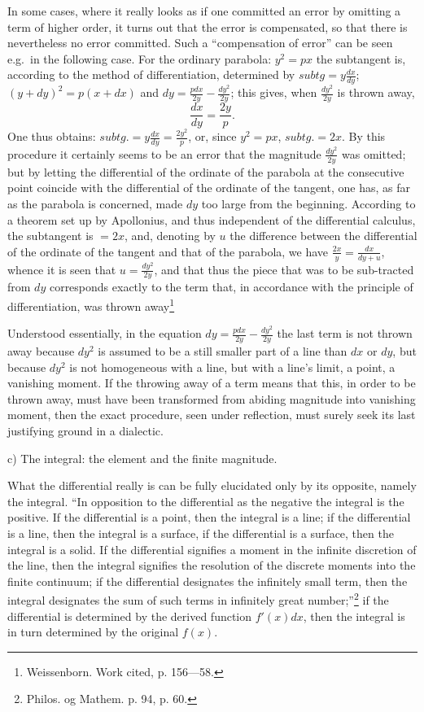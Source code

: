 \documentclass[12pt,a4paper,openany]{book}
\newcommand{\opage}[1]{\marginnote{\footnotesize\textit{[#1]}}}
\begin{document}
In some cases, where it really looks as if
one committed an error by omitting a term of higher order,
it turns out that the error is compensated, so that there is nevertheless %
no error committed. Such a ``compensation of error''
can be seen e.g.\ in the following case. For the ordinary
parabola: $y^{2}=px$ the subtangent is, according to the method of differentiation,
determined by $subtg=y\frac{dx}{dy}$; $(y+dy)^{2}=p(x+dx)$ and $dy=\frac{pdx}{2y}-\frac{dy^{2}}{2y}$; this gives, when $\frac{dy^{2}}{2y}$ is thrown away,
\setcounter{footnote}{0}%
\opage{97}\[ \frac{dx}{dy}=\frac{2y}{p}. \]
One thus obtains: $subtg.=y\frac{dx}{dy}=\frac{2y^{2}}{p}$, or, since $y^{2}=px$, $subtg.=2x$. By this procedure it certainly seems to be an error that the magnitude $\frac{dy^{2}}{2y}$ was omitted; but by letting the differential of the ordinate of the parabola
at the consecutive point coincide with the differential
of the ordinate of the tangent, one has, as far as the parabola
is concerned, made $dy$ too large from the beginning. According to
a theorem set up by Apollonius, and thus independent of the differential calculus, the subtangent is $=2x$, and, denoting by $u$ the difference between the differential of the ordinate of the tangent and that of the parabola, we have $\frac{2x}{y}=\frac{dx}{dy+u}$, whence
it is seen that $u=\frac{dy^{2}}{2y}$, and that thus the piece that was to be sub-tracted from $dy$ corresponds exactly to the term that, in accordance with
the principle of differentiation, was thrown away\footnote[1]{Weissenborn. Work cited, p. 156—58.}

Understood essentially, in the equation $dy=\frac{pdx}{2y}-\frac{dy^{2}}{2y}$ the last term is not thrown away because $dy^{2}$ is assumed to be
a still smaller part of a line than $dx$ or $dy$, but
because $dy^{2}$ is not homogeneous with a line, but with a line's
limit, a point, a vanishing moment. If
the throwing away of a term means that this, in order to be thrown away,
must have been transformed from abiding magnitude into vanishing moment, then the exact procedure, seen
under reflection, must surely seek its last justifying ground in
a dialectic.
\setcounter{footnote}{0}%
\opage{98}
\begin{center}c) The integral: the element and the finite magnitude.\end{center}

What the differential really is can be fully elucidated only
by its opposite, namely the integral. ``In opposition
to the differential as the negative the integral is the
positive. If the differential is a point, then the integral is a
line; if the differential is a line, then the integral is a surface,
if the differential is a surface, then the integral is a solid.
If the differential signifies a moment in the infinite discretion of the line,
then the integral signifies the resolution of the discrete moments
into the finite continuum; if the differential designates the
infinitely small term, then the integral designates the sum of such
terms in infinitely great number;''\footnote[1]{Philos. og Mathem. p. 94, p. 60.} if the differential is determined by
the derived function $f'(x)dx$, then the integral is in turn determined by the original $f(x)$.
\end{document}
